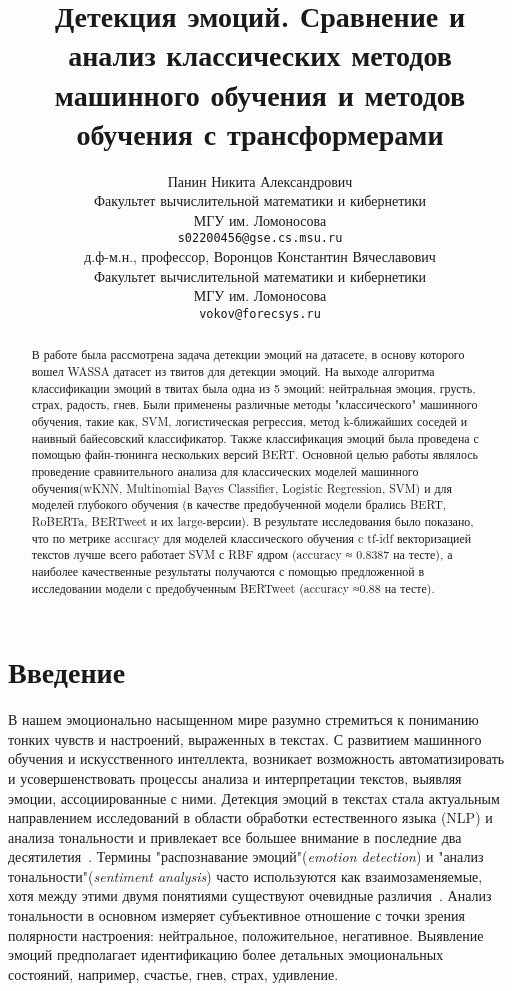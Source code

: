 \documentclass{article}
\title{Детекция эмоций. Сравнение и анализ классических методов машинного обучения и методов обучения с трансформерами}
\author{ Панин Никита Александрович \\
        Факультет вычислительной математики и кибернетики \\
        МГУ им. Ломоносова \\
        \texttt{s02200456@gse.cs.msu.ru} \\
	\And
	д.ф-м.н., профессор, Воронцов Константин Вячеславович \\
        Факультет вычислительной математики и кибернетики \\
        МГУ им. Ломоносова \\
        \texttt{vokov@forecsys.ru} \\
}
\date{}
\begin{document}
\maketitle

\begin{abstract}
	В работе была рассмотрена задача детекции эмоций на датасете, в основу которого вошел WASSA датасет из твитов для детекции эмоций. На выходе алгоритма классификации эмоций в твитах была одна из 5 эмоций: нейтральная эмоция, грусть, страх, радость, гнев. Были применены различные методы "классического" машинного обучения, такие как, SVM, логистическая регрессия, метод k-ближайших соседей и наивный байесовский классификатор. Также классификация эмоций была проведена с помощью файн-тюнинга нескольких версий BERT. Основной целью работы являлось проведение сравнительного анализа для классических моделей машинного обучения(wKNN, Multinomial Bayes Classifier, Logistic Regression, SVM) и для моделей глубокого обучения (в качестве предобученной модели брались BERT, RoBERTa, BERTweet и их large-версии). В результате исследования было показано, что по метрике accuracy для моделей классического обучения c tf-idf векторизацией текстов лучше всего работает SVM с RBF ядром (accuracy ≈ 0.8387 на тесте), а наиболее качественные результаты получаются с помощью предложенной в исследовании модели с предобученным BERTweet (accuracy ≈0.88 на тесте).
\end{abstract}



\section{Введение}
В нашем эмоционально насыщенном мире разумно стремиться к пониманию тонких чувств и настроений, выраженных в текстах. С развитием машинного обучения и искусственного интеллекта, возникает возможность автоматизировать и усовершенствовать процессы анализа и интерпретации текстов, выявляя эмоции, ассоциированные с ними. Детекция эмоций в текстах стала актуальным направлением исследований в области обработки естественного языка (NLP) и анализа тональности и привлекает все большее внимание в последние два десятилетия~\cite{affectdetectionintexts, jiawenfuji}. Термины "распознавание эмоций"({\itshape{emotion detection}}) и  "анализ тональности"({\itshape{sentiment analysis}}) часто используются как взаимозаменяемые, хотя между этими двумя понятиями существуют очевидные различия~\cite{yadollahi}. Анализ тональности в основном измеряет субъективное отношение с точки зрения полярности настроения: нейтральное, положительное, негативное. Выявление эмоций предполагает идентификацию более детальных эмоциональных состояний, например,  счастье, гнев, страх, удивление. 
\end{document}
